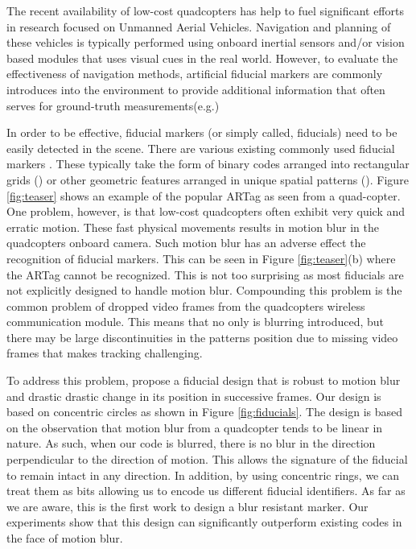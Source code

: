 \documentclass[runningheads]{llncs}
\begin{document}
The recent availability of low-cost quadcopters has help to fuel significant efforts in
research focused on Unmanned Aerial Vehicles.  Navigation and planning of
these vehicles is typically performed using onboard inertial sensors and/or
vision based modules that uses visual cues in the real world\cite{Davison:2007}. 
However, to evaluate the effectiveness of navigation methods, artificial
fiducial markers are commonly introduces into the environment to provide
additional information that often serves for ground-truth
measurements(e.g.\cite{Bosnak:2012}\cite{Lim09}\cite{Klopschitz:2007})

In order to be effective, fiducial markers (or simply called, fiducials) need
to be easily detected in the scene.  There are various existing commonly
used fiducial markers 
\cite{NaimarkF02}\cite{ARToolkit02}\cite{Fiala05}\cite{Pitag13}\cite{runetag11}.
These typically take the form of binary codes arranged into rectangular grids (\cite{ARToolkit02}\cite{Fiala05})
or other geometric features arranged in unique spatial patterns
(\cite{NaimarkF02}\cite{Pitag13}\cite{runetag11}).
Figure \ref{fig:teaser} shows an example of the popular ARTag\cite{Fiala05} as
seen from a quad-copter.  One problem, however, is that low-cost quadcopters
often exhibit very quick and erratic motion.  These fast physical movements
results in motion blur in the quadcopters onboard camera.  Such motion blur has an adverse effect the
recognition of fiducial  markers.  This can be seen in Figure
\ref{fig:teaser}(b) where the ARTag cannot be recognized. This is not too surprising as most
fiducials are not explicitly designed to handle motion blur.  Compounding this
problem is the common problem of dropped video frames from the quadcopters
wireless communication module.   This means that no only is blurring
introduced, but there may be large discontinuities in the patterns position due
to missing video frames that makes tracking challenging.

To address this problem, propose a fiducial design that is robust to motion
blur and drastic drastic change in its position in successive frames.  Our
design is based on concentric circles as shown in Figure \ref{fig:fiducials}. 
The design is based on the observation that motion blur from a quadcopter tends
to be linear in nature.  As such, when our code is blurred, there is no blur in
the direction perpendicular to the direction of motion.   This allows the
signature of the fiducial to remain intact in any direction.  In addition, by
using concentric rings, we can treat them as bits allowing us to encode us
different fiducial identifiers.  As far as we are aware, this is the first work
to design a blur resistant marker.   Our experiments show that this design can
significantly outperform existing codes in the face of motion blur.
\end{document}

